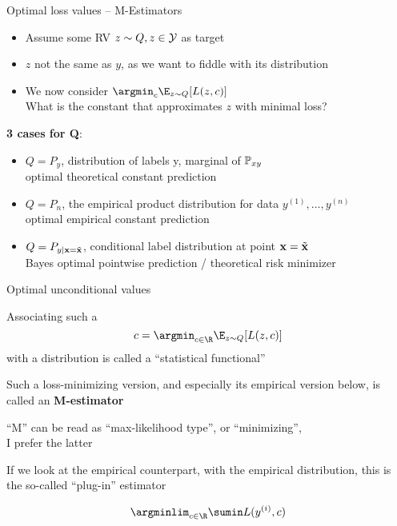 \documentclass[11pt,compress,t,notes=noshow, xcolor=table]{beamer}
\begin{document}
\begin{frame}{Optimal loss values -- M-Estimators}

\begin{itemize}
\item Assume some RV $z \sim Q, z \in \mathcal{Y}$ as target
\item $z$ not the same as $y$, as we want to fiddle with its distribution
\item We now consider $\argmin_c \E_{z \sim Q}[L(z, c)]$\\
What is the constant that approximates $z$ with minimal loss?

\end{itemize}

\vfill

\textbf{3 cases for Q}:\\
\begin{itemize}
\item $Q = P_y$, distribution of labels y, marginal of $\mathbb{P}_{xy}$\\
optimal theoretical constant prediction

\item $Q = P_n$, the empirical product distribution for data $y^{(1)}, \ldots, y^{(n)}$\\
optimal empirical constant prediction

\item $Q = P_{y | \mathbf{x} = \tilde{\mathbf{x}}}$, conditional label distribution at point $\mathbf{x} = \tilde{\mathbf{x}}$\\
Bayes optimal pointwise prediction / theoretical risk minimizer 

\end{itemize}


\end{frame}


\begin{framei}[sep=M]{Optimal unconditional values}

\item Associating such a 
$$c = \argmin_{c \in \R} \E_{z \sim Q}[L(z, c)]$$ with 
a distribution is called a ``statistical functional''

\item Such a loss-minimizing version, and especially its empirical version below, is called an \textbf{M-estimator}\\
\item ``M'' can be read as ``max-likelihood type'', or ``minimizing'',\\
I prefer the latter

\item If we look at the empirical counterpart, with the empirical distribution, this is the so-called ``plug-in'' estimator

$$\argminlim_{c \in \R} \sumin L(\yi,c)$$

\end{framei}
\end{document}
